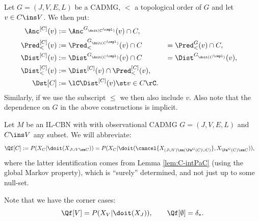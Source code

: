 \begin{Not}
    Let $G=(J,V,E,L)$  be a CADMG, $<$ a topological order of $G$ and let $v \in C \ins V$.
    We then put:
    \begin{align*}
        \Anc^{[C]}(v) &:= \Anc^{G_{\doit(C^\cmpl)}}(v) \cap C, \\
        \Pred^{[C]}_<(v)&:= \Pred_<^{G_{\doit(C^\cmpl)}}(v) \cap C &&= \Pred_<^{G}(v) \cap C, \\
        \Dist^{[C]}(v)&:= \Dist^{G_{\doit(C^\cmpl)}}(v) \cap C &&= \Dist^{G_{\doit(C^\cmpl)}}(v) , \\
        \Dist^{[C]}_<(v)&:= \Dist^{[C]}(v) \cap \Pred^{[C]}_<(v), \\
        \Dst[C] &:= \lC \Dist^{[C]}(v) \st v \in C \rC.
    \end{align*}
    Similarly, if we use the subscript $\le$ we then also include $v$.
    Also note that the dependence on $G$ in the above constructions is implicit.
\end{Not}



\begin{Not}
     Let $M$ be an IL-CBN with with observational CADMG $G=(J,V,E,L)$ and $C \ins V$ any subset.
     We will abbreviate:
    \begin{align*} \Qf[C] 
        &:= P(X_C|\doit(X_{J \cup V \sm C})) 
        = P(X_C|\doit(\cancel{X_{(J \cup V) \sm (\Pa^G(C) \cup C)}}, X_{\Pa^G(C)\sm C})),
    \end{align*}
    where the latter identification comes from Lemma \ref{lem:C-intPaC} (using the global Markov property), which is 
    ``surely'' determined, and not just up to some null-set.
    
    Note that we have the corner cases:
    \[ \Qf[V]=P(X_V|\doit(X_J)), \qquad \Qf[\emptyset]=\delta_\ast.  \]
\end{Not}



